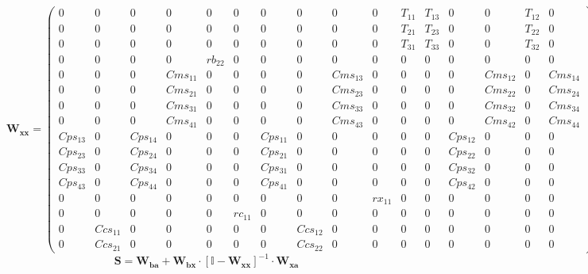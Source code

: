 \[ \mathbf{W_{xx}} = \left(\begin{smallmatrix} 0 & 0 & 0 & 0 & 0 & 0 &
0 & 0 & 0 & 0 & T_{11} & T_{13} & 0 & 0 & T_{12} & 0 \\ 0 & 0 & 0 & 0
& 0 & 0 & 0 & 0 & 0 & 0 & T_{21} & T_{23} & 0 & 0 & T_{22} & 0 \\ 0 &
0 & 0 & 0 & 0 & 0 & 0 & 0 & 0 & 0 & T_{31} & T_{33} & 0 & 0 & T_{32} &
0 \\ 0 & 0 & 0 & 0 & rb_{22} & 0 & 0 & 0 & 0 & 0 & 0 & 0 & 0 & 0 & 0 &
0 \\ 0 & 0 & 0 & Cms_{11} & 0 & 0 & 0 & 0 & Cms_{13} & 0 & 0 & 0 & 0 &
Cms_{12} & 0 & Cms_{14} \\ 0 & 0 & 0 & Cms_{21} & 0 & 0 & 0 & 0 &
Cms_{23} & 0 & 0 & 0 & 0 & Cms_{22} & 0 & Cms_{24} \\ 0 & 0 & 0 &
Cms_{31} & 0 & 0 & 0 & 0 & Cms_{33} & 0 & 0 & 0 & 0 & Cms_{32} & 0 &
Cms_{34} \\ 0 & 0 & 0 & Cms_{41} & 0 & 0 & 0 & 0 & Cms_{43} & 0 & 0 &
0 & 0 & Cms_{42} & 0 & Cms_{44} \\ Cps_{13} & 0 & Cps_{14} & 0 & 0 & 0
& Cps_{11} & 0 & 0 & 0 & 0 & 0 & Cps_{12} & 0 & 0 & 0 \\ Cps_{23} & 0
& Cps_{24} & 0 & 0 & 0 & Cps_{21} & 0 & 0 & 0 & 0 & 0 & Cps_{22} & 0 &
0 & 0 \\ Cps_{33} & 0 & Cps_{34} & 0 & 0 & 0 & Cps_{31} & 0 & 0 & 0 &
0 & 0 & Cps_{32} & 0 & 0 & 0 \\ Cps_{43} & 0 & Cps_{44} & 0 & 0 & 0 &
Cps_{41} & 0 & 0 & 0 & 0 & 0 & Cps_{42} & 0 & 0 & 0 \\ 0 & 0 & 0 & 0 &
0 & 0 & 0 & 0 & 0 & rx_{11} & 0 & 0 & 0 & 0 & 0 & 0 \\ 0 & 0 & 0 & 0 &
0 & rc_{11} & 0 & 0 & 0 & 0 & 0 & 0 & 0 & 0 & 0 & 0 \\ 0 & Ccs_{11} &
0 & 0 & 0 & 0 & 0 & Ccs_{12} & 0 & 0 & 0 & 0 & 0 & 0 & 0 & 0 \\ 0 &
Ccs_{21} & 0 & 0 & 0 & 0 & 0 & Ccs_{22} & 0 & 0 & 0 & 0 & 0 & 0 & 0 &
0 \end{smallmatrix}\right) \]
\[ \mathbf{S}=\mathbf{W_{ba}}+\mathbf{W_{bx}}\cdot\left[ \mathbb{I}
-\mathbf{W_{xx}}\right]^{-1}\cdot\mathbf{W_{xa}} \]
